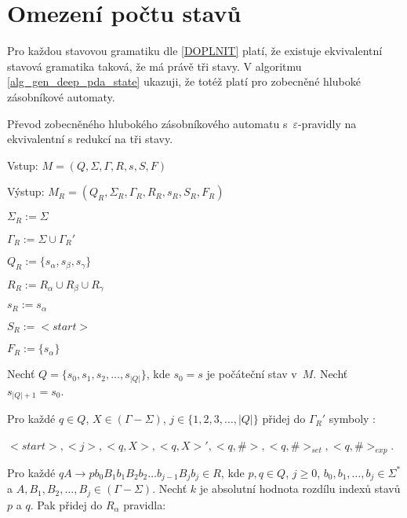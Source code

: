 \section{Omezení počtu stavů}


Pro každou stavovou gramatiku dle \ref{DOPLNIT} platí, že existuje ekvivalentní stavová gramatika taková, že má právě tři stavy. V algoritmu \ref{alg_gen_deep_pda_state} ukazuji, že totéž platí pro zobecněné hluboké zásobníkové automaty.



\begin{Alg}\label{alg_gen_deep_pda_state}
Převod zobecněného hlubokého zásobníkového automatu s~$\varepsilon$-pravidly na ekvivalentní s redukcí na tři stavy.

\begin{list}{}{\setlength\parsep{0cm} \setlength\itemsep{0cm} \setlength\leftmargin{1em}}
   \item Vstup: $M = (Q,\Sigma,\Gamma, R, s, S, F)$ 
   \item Výstup: $M_{R} = (Q_{R}, \Sigma_{R}, {\Gamma}_{R}, R_{R}, s_{R},  S_{R}, F_{R})$ \medskip

   \item ${\Sigma}_{R} := \Sigma$
   \item ${\Gamma}_{R} := \Sigma \cup {\Gamma}_{R}'$
   \item $Q_{R} := \{s_\alpha, s_\beta, s_\gamma \}$
   \item $R_{R} := R_{\alpha} \cup R_{\beta} \cup R_{\gamma}$
   \item $s_{R} := s_{\alpha} $
   \item $S_{R} := <start> $
   \item $F_{R} := \{s_{\alpha}\} $ \medskip

   \item Nechť $Q = \{s_0, s_1, s_2, \dots,s_{|Q|}\}$, kde $s_0 = s$ je počáteční stav v~$M$. Nechť $s_{|Q|+1} = s_0$.\medskip

   \item Pro každé $q \in Q$, $X \in (\Gamma - \Sigma)$, $j \in \{1,2,3,\dots,|Q|\}$ přidej do ${\Gamma}_{R}'$ symboly :
   \item $<start>, <j>, <q, X>, <q, X>', <q, \#>, <q, \#>_{set}, <q, \#>_{exp}$.\medskip

   \item Pro každé $qA \rightarrow p b_0 B_1 b_1 B_2 b_2 \dots b_{j-1} B_{j} b_j \in R$, kde $p, q \in Q$, $j \ge 0$, $b_0,b_1,\dots,b_j \in {\Sigma}^*$ a $A, B_1,B_2,\dots,B_j \in (\Gamma - \Sigma)$. 
         Nechť $k$ je absolutní hodnota rozdílu indexů stavů $p$ a $q$. 
         Pak přidej do $R_\alpha$ pravidla:


\end{list}
\end{Alg}
